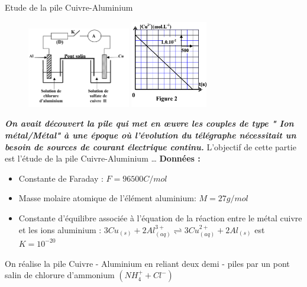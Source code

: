 \documentclass[12pt]{article}
\begin{document}
\begin{Box2}{Etude de la pile Cuivre-Aluminium}


	\begin{figure}
		\begin{center}
			\includegraphics[width=0.4\textwidth]{./img/pile00.png}
			\includegraphics[width=0.3\textwidth]{./img/pile01.png}
		\end{center}
	\end{figure}



	\emph{ \textbf{ On avait découvert la pile qui met en œuvre les couples de type " Ion métal/Métal" à une
			époque où l’évolution du télégraphe nécessitait un besoin de sources de courant électrique
			continu. }}
	L’objectif de cette partie est l’étude de la pile Cuivre-Aluminium \dots
	\textbf{Données :}
	\begin{itemize}
		\item Constante de Faraday : $F = 96500 C/mol$
		\item Masse molaire atomique de l’élément aluminium: $M = 27g/mol$
		\item Constante d’équilibre associée à l’équation de la réaction entre le métal cuivre et les ions aluminium :
      $ 3Cu_{(s)} + 2Al^{3+}_{(aq)} \rightleftharpoons 3Cu^{2+}_{(aq)} + 2Al_{(s)}$ est $K = 10^{-20}$
	\end{itemize}

  On réalise la pile Cuivre - Aluminium
en reliant deux demi - piles par un pont
  salin de chlorure d’ammonium  $(NH_4^+ + Cl^-)$


\end{Box2}
\end{document}
